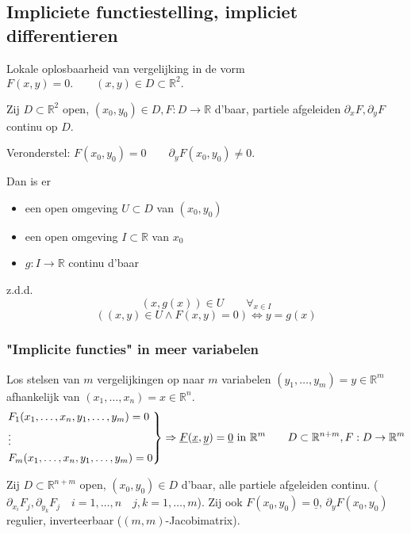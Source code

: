\documentclass[a4paper]{exam}
\theoremstyle{definition}
\newcommand{\reals}{\mathbb{R}}
\begin{document}
		\subsection{Impliciete functiestelling, impliciet differentieren}
			Lokale oplosbaarheid van vergelijking in de vorm $ F(x,y)=0. \qquad (x,y) \in D \subset \reals^2. $
			
			 Zij $D \subset \reals^2$ open, $ (x_0 , y_0 ) \in D, F:D \rightarrow \reals $ d'baar, partiele afgeleiden $ \partial_x F, \partial_y F $ continu op $ D $.
			
			Veronderstel: $ F(x_0, y_0) = 0 \qquad \partial_y F(x_0, y_0)\neq 0 $.
			
			Dan is er 
			\begin{itemize} 
				\item[] een open omgeving $ U \subset D $ van $ (x_0,y_0) $
				\item[] een open omgeving $ I \subset \reals $ van $ x_0 $
				\item[] $ g: I \rightarrow \reals $ continu d'baar 
			\end{itemize}
			z.d.d.
			\[ (x,g(x)) \in U \qquad \forall_{x \in I} \]
			\[ ((x,y) \in U \wedge F(x,y)=0) \Leftrightarrow y=g(x) \]
			
			
			\subsubsection{"Implicite functies" in meer variabelen}
				Los stelsen van $m$ vergelijkingen op naar $m$ variabelen $(y_1, \dots ,y_m) = y \in \reals^m$ afhankelijk van $ (x_1, \dots , x_n) = x \in \reals^n $.
				\[
				\begin{rcases*}
				F_1(x_1,\dots,x_n,y_1,\dots,y_m)=0 \\
				\vdots \\
				F_m(x_1,\dots,x_n,y_1,\dots,y_m)=0
				\end{rcases*} \Rightarrow \underline{F}(\underline{x},\underline{y})=\underline{0} \text{ in } \reals^m \qquad D \subset \reals^{n+m}, F: D \rightarrow \reals^m
				\]
				
				 Zij $ D\subset \reals^{n+m} $ open, $ (x_0, y_0) \in D $ d'baar, alle partiele afgeleiden continu. ($ \partial_{x_i}F_j , \partial_{y_k}F_j \quad i=1,\dots,n \quad j,k=1,\dots,m $). Zij ook $ F(x_0, y_0) = \underline{0}$, $ \partial_y F(x_0,y_0) $ regulier, inverteerbaar ($ (m,m) $-Jacobimatrix).
				
\end{document}
